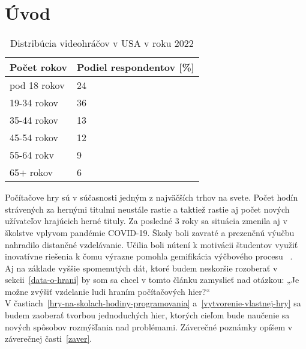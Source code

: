 \section{Úvod}
\begin{table}[!ht]
  \caption{Distribúcia videohráčov v USA v roku 2022}
   \centering
   \begin{tabular}{|l|l|}
   \hline
       Počet rokov & Podiel respondentov [\%] \\ \hline
       pod 18 rokov & 24 \\ \hline
       19-34 rokov & 36 \\ \hline
       35-44 rokov & 13 \\ \hline
       45-54 rokov & 12 \\ \hline
       55-64 rokv & 9 \\ \hline
       65+ rokov & 6 \\ \hline
   \end{tabular}
\end{table}
Počítačove hry sú v súčasnosti jedným z najväčších trhov na svete. Počet hodín strávených 
za hernými titulmi neustále rastie a taktiež rastie aj počet nových užívateľov hrajúcich 
herné tituly. Za posledné 3 roky sa situácia zmenila aj v školstve vplyvom pandémie COVID-19. Školy
boli zavraté a prezenčnú výučbu nahradilo distančné vzdelávanie. Učilia boli nútení k motivácii študentov využiť 
inovatívne riešenia k čomu výrazne pomohla gemifikácia výčbového procesu ~\cite{gemifikaciaPandemia, gemifikaciaNaSkole-1}.\\ 
Aj na základe vyššie spomenutých dát, ktoré budem neskoršie rozoberať v 
sekcii~\ref{data-o-hrani} by som sa chcel v tomto článku zamyslieť nad otázkou: 
„Je možne zvýšiť vzdelanie ludi hraním počítačových hier?“\\ 
V častiach~\ref{hry-na-skolach-hodiny-programovania} a~\ref{vytvorenie-vlastnej-hry} sa budem zaoberať 
tvorbou jednoduchých hier, ktorých cieľom bude naučenie sa nových spôsobov rozmýšľania nad problémami.
Záverečné poznámky opíšem v záverečnej časti~\ref{zaver}.